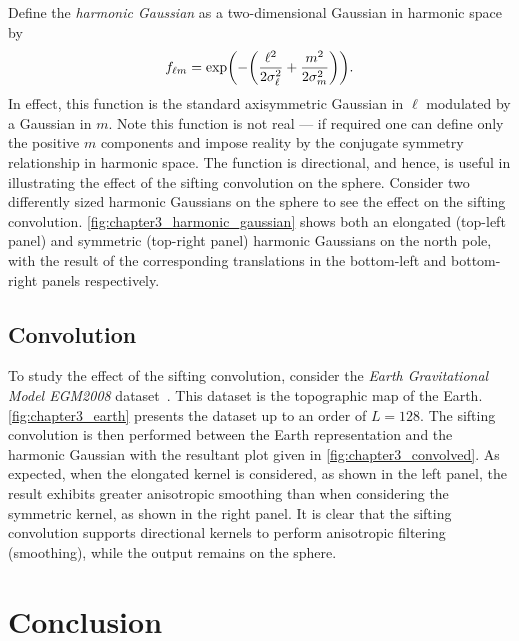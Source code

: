 Define the \emph{harmonic Gaussian} as a two-dimensional Gaussian in harmonic space by
%
\begin{equation}\label{eq:chapter3_harmonic_gaussian}
	{f}_{\ell m}
	= \exp(-\bigg(\frac{{\ell}^{2}}{2\sigma_{\ell}^{2}} + \frac{{m}^{2}}{2\sigma_{m}^{2}}\bigg)).
\end{equation}
%
In effect, this function is the standard axisymmetric Gaussian in \(\ell{}\) modulated by a Gaussian in \(m\).
Note this function is not real --- if required one can define only the positive \(m\) components and impose reality by the conjugate symmetry relationship in harmonic space.
The function is directional, and hence, is useful in illustrating the effect of the sifting convolution on the sphere.
Consider two differently sized harmonic Gaussians on the sphere to see the effect on the sifting convolution.
\cref{fig:chapter3_harmonic_gaussian} shows both an elongated (top-left panel) and symmetric (top-right panel) harmonic Gaussians on the north pole, with the result of the corresponding translations in the bottom-left and bottom-right panels respectively.



\subsection{Convolution}\label{sec:chapter3_convolution}

To study the effect of the sifting convolution, consider the \emph{Earth Gravitational Model EGM2008} dataset~\autocite{Pavlis2013}.
This dataset is the topographic map of the Earth.
\cref{fig:chapter3_earth} presents the dataset up to an order of \(L=128\).
The sifting convolution is then performed between the Earth representation and the harmonic Gaussian with the resultant plot given in \cref{fig:chapter3_convolved}.
As expected, when the elongated kernel is considered, as shown in the left panel, the result exhibits greater anisotropic smoothing than when considering the symmetric kernel, as shown in the right panel.
It is clear that the sifting convolution supports directional kernels to perform anisotropic filtering (smoothing), while the output remains on the sphere.





\section{Conclusion}\label{sec:chapter3_conclusion}

